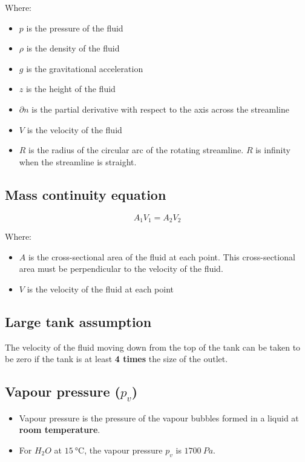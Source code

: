 \documentclass[11pt]{article}
\begin{document}
Where:
\begin{itemize}
\item \(p\) is the pressure of the fluid
\item \(\rho\) is the density of the fluid
\item \(g\) is the gravitational acceleration
\item \(z\) is the height of the fluid
\item \(\partial n\) is the partial derivative with respect to the axis across the streamline
\item \(V\) is the velocity of the fluid
\item \(R\) is the radius of the circular arc of the rotating streamline. \(R\) is infinity when the streamline is straight.
\end{itemize}

\subsection{Mass continuity equation}
\label{sec:org2779340}
\[A_1 V_1 = A_2 V_2\]

Where:
\begin{itemize}
\item \(A\) is the cross-sectional area of the fluid at each point. This cross-sectional area must be perpendicular to the velocity of the fluid.
\item \(V\) is the velocity of the fluid at each point
\end{itemize}

\subsection{Large tank assumption}
\label{sec:org9624dcb}
The velocity of the fluid moving down from the top of the tank can be taken to be zero if the tank is at least \textbf{4 times} the size of the outlet.

\subsection{Vapour pressure (\(p_v\))}
\label{sec:orgc0c678b}
\begin{itemize}
\item Vapour pressure is the pressure of the vapour bubbles formed in a liquid at \textbf{room temperature}.
\item For \(H_{2}O\) at \(\qty{15}{\degreeCelsius}\), the vapour pressure \(p_v\) is \(\qty{1700}{Pa}\).
\end{itemize}
\end{document}
